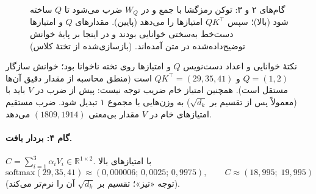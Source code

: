 \begin{figure}[htbp]
\centering
{}
\caption{گام‌های ۲ و ۳:  توکن رمزگشا با  جمع و در $W_Q$ ضرب می‌شود تا $Q$ ساخته شود (بالا)؛ سپس $QK^{\top}$ امتیازها را می‌دهد (پایین). مقدارهای $Q$ و امتیازها دست‌خط به‌سختی خوانایی بودند و در اینجا بر پایهٔ خوانش توضیح‌داده‌شده در متن آمده‌اند. (بازسازی‌شده از تختهٔ کلاس)}
\end{figure}

\begin{correctionbox}{نکتهٔ خوانایی و }
اعداد دست‌نویس $Q$ و امتیازها روی تخته ناخوانا بود؛ خوانش سازگار $Q=(1,2)$ و $QK^\top=(29,35,41)$ است (منطق محاسبه از مقدار دقیق آن‌ها مستقل است). همچنین امتیاز خام ضریب توجه نیست: پیش از ضرب در $V$ باید با  (معمولاً پس از تقسیم بر $\sqrt{d_k}$) به وزن‌هایی با مجموع ۱ تبدیل شود. ضرب مستقیم امتیازهای خام در $V$ مقدار بی‌معنی $(1809,1914)$ می‌دهد.
\end{correctionbox}

\paragraph{گام ۴: بردار بافت.} $C=\sum_{i=1}^{3}\alpha_i V_i\in\mathbb{R}^{1\times 2}$. با امتیازهای بالا
\[
\mathrm{softmax}(29,35,41)\approx(0{,}000006;\,0{,}0025;\,0{,}9975),\qquad C\approx(18{,}995;\;19{,}995)
\]
(توجه «تیز»؛ تقسیم بر $\sqrt{d_k}$ آن را نرم‌تر می‌کند).

